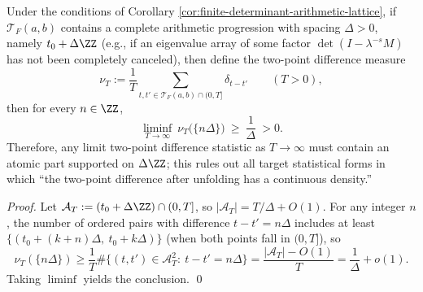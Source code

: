 \begin{corollary}\label{cor:finite-determinant-statistical-lattice}
Under the conditions of Corollary \ref{cor:finite-determinant-arithmetic-lattice}, if \(\mathcal{T}_F(a,b)\) contains a complete arithmetic progression with spacing \(\Delta>0\), namely \(t_0+\Delta\ZZ\) (e.g., if an eigenvalue array of some factor \(\det(I-\lambda^{-s}M)\) has not been completely canceled), then define the two-point difference measure
\[
\nu_T:=\frac{1}{T}\sum_{t,t'\in\mathcal{T}_F(a,b)\cap(0,T]}\delta_{t-t'}\qquad(T>0),
\]
then for every \(n\in\ZZ\),
\[
\liminf_{T\to\infty}\ \nu_T\bigl(\{n\Delta\}\bigr)\ \ge\ \frac{1}{\Delta}\ >0.
\]
Therefore, any limit two-point difference statistic as \(T\to\infty\) must contain an atomic part supported on \(\Delta\ZZ\); this rules out all target statistical forms in which ``the two-point difference after unfolding has a continuous density.''
\end{corollary}
\begin{proof}
Let \(\mathcal{A}_T:=(t_0+\Delta\ZZ)\cap(0,T]\), so \(|\mathcal{A}_T|=T/\Delta+O(1)\).
For any integer \(n\), the number of ordered pairs with difference \(t-t'=n\Delta\) includes at least \(\{(t_0+(k+n)\Delta,\ t_0+k\Delta)\}\) (when both points fall in \((0,T]\)), so
\[
\nu_T(\{n\Delta\})
\ge
\frac{1}{T}\#\bigl\{(t,t')\in\mathcal{A}_T^2:\ t-t'=n\Delta\bigr\}
=\frac{|\mathcal{A}_T|-O(1)}{T}
=\frac{1}{\Delta}+o(1).
\]
Taking \(\liminf\) yields the conclusion. \qed
\end{proof}

